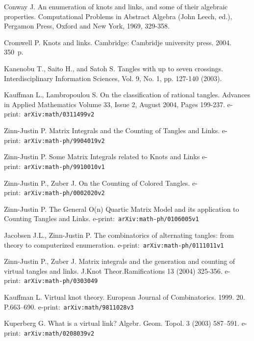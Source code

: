 \newpage
\renewcommand{\bibname}{Список литературы}
\begin{thebibliography}{99}
	\addcontentsline{toc}{section}{\bibname}

	Conway J. An enumeration of knots and links, and some of their algebraic
	properties. Computational Problems in Abstract Algebra (John Leech, ed.), Pergamon Press, Oxford
	and New York, 1969, 329-358.

	Cromwell P. Knots and links. Cambridge: Cambridje university press. 2004. 350~p.

	Kanenobu T., Saito H., and Satoh S. Tangles with up to seven crossings.
	Interdisciplinary Information Sciences, Vol. 9, No. 1, pp. 127-140 (2003).

	Kauffman L., Lambropoulou S. On the classification of rational tangles.
	Advances in Applied Mathematics Volume 33, Issue 2, August 2004, Pages 199-237.
	e-print:~\texttt{arXiv:math/0311499v2}

	Zinn-Justin P. Matrix Integrals and the Counting of Tangles and Links.
	e-print:~\texttt{arXiv:math-ph/9904019v2}

	Zinn-Justin P. Some Matrix Integrals related to Knots and Links
	e-print:~\texttt{arXiv:math-ph/9910010v1}

	Zinn-Justin P., Zuber J. On the Counting of Colored Tangles.
	e-print:~\texttt{arXiv:math-ph/0002020v2}

	Zinn-Justin P. The General O(n) Quartic Matrix Model and its application to Counting Tangles and Links.
	e-print:~\texttt{arXiv:math-ph/0106005v1}

	Jacobsen J.L., Zinn-Justin P. The combinatorics of alternating tangles:
	from theory to computerized enumeration. e-print:~\texttt{arXiv:math-ph/0111011v1}

	Zinn-Justin P., Zuber J. Matrix integrals and the generation and counting
	of virtual tangles and links. J.Knot Theor.Ramifications 13 (2004) 325-356.
	e-print:~\texttt{arXiv:math-ph/0303049}

	Kauffman L. Virtual knot theory. European Journal of Combinatorics. 1999.
	20. P.663--690.  e-print:~\texttt{arXiv:math/9811028v3}

	Kuperberg G. What is a virtual link? Algebr. Geom. Topol. 3 (2003) 587--591.
	e-print:~\texttt{arXiv:math/0208039v2}


\end{thebibliography}
